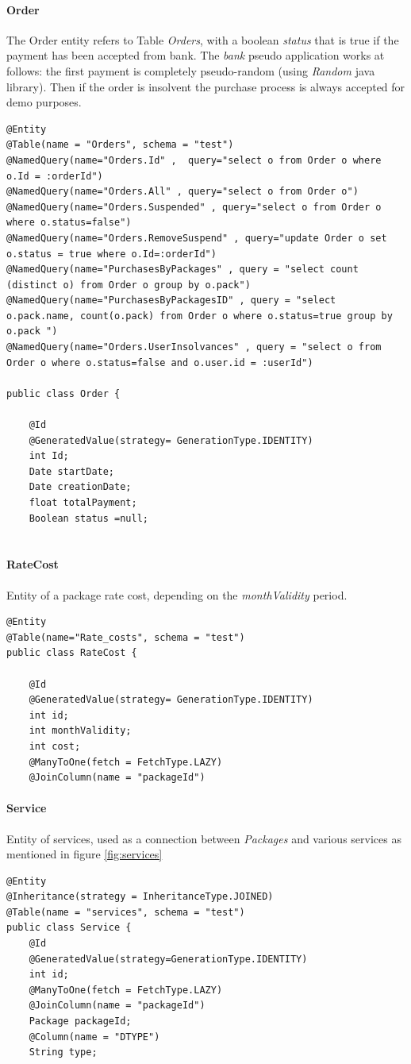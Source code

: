 \documentclass{article}
\begin{document}
\paragraph{Order}
The Order entity refers to Table \emph{Orders}, with a boolean \emph{status} that is true if the payment has been accepted from bank. The \emph{bank} pseudo application works at follows: the first payment is completely pseudo-random (using \emph{Random} java library). Then if the order is insolvent the purchase process is always accepted for demo purposes.
\begin{lstlisting}
@Entity
@Table(name = "Orders", schema = "test")
@NamedQuery(name="Orders.Id" ,  query="select o from Order o where o.Id = :orderId")
@NamedQuery(name="Orders.All" , query="select o from Order o") @NamedQuery(name="Orders.Suspended" , query="select o from Order o where o.status=false")
@NamedQuery(name="Orders.RemoveSuspend" , query="update Order o set o.status = true where o.Id=:orderId")
@NamedQuery(name="PurchasesByPackages" , query = "select count (distinct o) from Order o group by o.pack")
@NamedQuery(name="PurchasesByPackagesID" , query = "select  o.pack.name, count(o.pack) from Order o where o.status=true group by o.pack ")
@NamedQuery(name="Orders.UserInsolvances" , query = "select o from Order o where o.status=false and o.user.id = :userId")

public class Order {

    @Id
    @GeneratedValue(strategy= GenerationType.IDENTITY)
    int Id;
    Date startDate;
    Date creationDate;
    float totalPayment;
    Boolean status =null;
    
\end{lstlisting}


\paragraph{RateCost}
Entity of a package rate cost, depending on the \emph{monthValidity} period.
\begin{lstlisting}
@Entity
@Table(name="Rate_costs", schema = "test")
public class RateCost {

    @Id
    @GeneratedValue(strategy= GenerationType.IDENTITY)
    int id;
    int monthValidity;
    int cost;
    @ManyToOne(fetch = FetchType.LAZY)
    @JoinColumn(name = "packageId")
\end{lstlisting}

\paragraph{Service}
Entity of services, used as a connection between \emph{Packages} and various services as mentioned in figure \ref{fig:services}
\begin{lstlisting}
@Entity
@Inheritance(strategy = InheritanceType.JOINED)
@Table(name = "services", schema = "test")
public class Service {
    @Id
    @GeneratedValue(strategy=GenerationType.IDENTITY)
    int id;
    @ManyToOne(fetch = FetchType.LAZY)
    @JoinColumn(name = "packageId")
    Package packageId;
    @Column(name = "DTYPE")
    String type;
\end{lstlisting}
\end{document}
